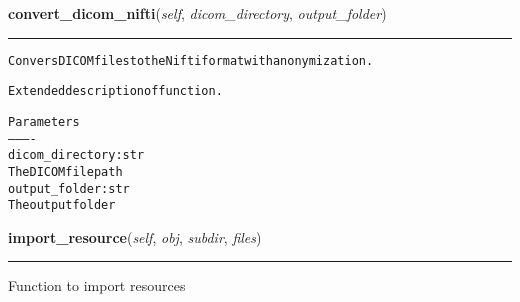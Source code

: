     \label{source:Xnat:Xnat:convert_dicom_nifti}

    \vspace{0.5ex}

\hspace{.8\funcindent}\begin{boxedminipage}{\funcwidth}

    \raggedright \textbf{convert\_dicom\_nifti}(\textit{self}, \textit{dicom\_directory}, \textit{output\_folder})

    \vspace{-1.5ex}

    \rule{\textwidth}{0.5\fboxrule}
\setlength{\parskip}{2ex}
\begin{alltt}

Convers DICOM files to the Nifti format with anonymization.

Extended description of function.

Parameters
----------
dicom\_directory : str
    The DICOM file path
output\_folder : str
    The output folder
\end{alltt}

\setlength{\parskip}{1ex}
    \end{boxedminipage}

    \label{source:Xnat:Xnat:import_resource}

    \vspace{0.5ex}

\hspace{.8\funcindent}\begin{boxedminipage}{\funcwidth}

    \raggedright \textbf{import\_resource}(\textit{self}, \textit{obj}, \textit{subdir}, \textit{files})

    \vspace{-1.5ex}

    \rule{\textwidth}{0.5\fboxrule}
\setlength{\parskip}{2ex}
    Function to import resources

\setlength{\parskip}{1ex}
    \end{boxedminipage}

    \label{source:Xnat:Xnat:send_sequence}

    \vspace{0.5ex}

